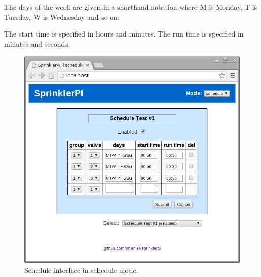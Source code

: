 \documentclass{article}
\begin{document}
The days of the week are given in a shorthand notation
where M is Monday, T is Tuesday, W is Wednesday and so on.

The start time is specified in hours and minutes.
The run time is specified in minutes and seconds.

\begin{figure}[h!]
\begin{center}
\includegraphics[scale=0.50]{../testing/img/www-schedule_test1.png}
\end{center}
\caption{Schedule interface in schedule mode.}
\label{fig:wwwsched}
\end{figure}


\pagebreak
\glsaddall
\printglossaries

\clearpage
\printbibliography[heading=bibintoc]
\end{document}
